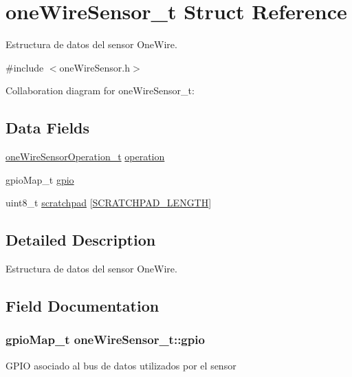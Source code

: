 \hypertarget{structoneWireSensor__t}{}\section{one\+Wire\+Sensor\+\_\+t Struct Reference}
\label{structoneWireSensor__t}


Estructura de datos del sensor One\+Wire.  




{\ttfamily \#include $<$one\+Wire\+Sensor.\+h$>$}



Collaboration diagram for one\+Wire\+Sensor\+\_\+t\+:
\subsection*{Data Fields}
\begin{DoxyCompactItemize}
\item 
\hyperlink{structoneWireSensorOperation__t}{one\+Wire\+Sensor\+Operation\+\_\+t} \hyperlink{structoneWireSensor__t_ada7c05de5b39edd0d2488c91dad12530}{operation}
\item 
gpio\+Map\+\_\+t \hyperlink{structoneWireSensor__t_a5471e3c829eeaef1d9dec9e4aedd58aa}{gpio}
\item 
uint8\+\_\+t \hyperlink{structoneWireSensor__t_a2e6e1b03a1f5e86a53978c07e1371c01}{scratchpad} \mbox{[}\hyperlink{oneWireSensor_8h_a3c3ec46347886e5516c7a458b26ef5e5}{S\+C\+R\+A\+T\+C\+H\+P\+A\+D\+\_\+\+L\+E\+N\+G\+TH}\mbox{]}
\end{DoxyCompactItemize}


\subsection{Detailed Description}
Estructura de datos del sensor One\+Wire. 

\subsection{Field Documentation}
\subsubsection[{\texorpdfstring{gpio}{gpio}}]{\setlength{\rightskip}{0pt plus 5cm}gpio\+Map\+\_\+t one\+Wire\+Sensor\+\_\+t\+::gpio}\hypertarget{structoneWireSensor__t_a5471e3c829eeaef1d9dec9e4aedd58aa}{}\label{structoneWireSensor__t_a5471e3c829eeaef1d9dec9e4aedd58aa}
G\+P\+IO asociado al bus de datos utilizados por el sensor 
